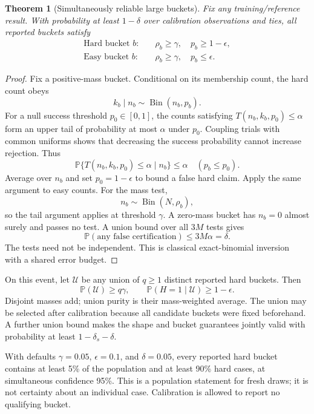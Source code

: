 \documentclass[10pt,letterpaper]{article}
\newtheorem{theorem}{Theorem}
\newcommand{\Prb}{\mathbb P}
\begin{document}
\begin{theorem}[Simultaneously reliable large buckets]\label{thm:buckets}
Fix any training/reference result. With probability at least $1-\delta$ over calibration observations and ties, all reported buckets satisfy
\[
 \boxed{\begin{aligned}
 \text{Hard bucket }b:&\quad\rho_b\ge\gamma,\quad p_b\ge1-\epsilon,\\
 \text{Easy bucket }b:&\quad\rho_b\ge\gamma,\quad p_b\le\epsilon.
 \end{aligned}}
\]
\end{theorem}
\begin{proof}
Fix a positive-mass bucket. Conditional on its membership count, the hard count obeys
\[
 k_b\mid n_b\sim\operatorname{Bin}(n_b,p_b).
\]
For a null success threshold $p_0\in[0,1]$, the counts satisfying $T(n_b,k_b,p_0)\le\alpha$ form an upper tail of probability at most $\alpha$ under $p_0$. Coupling trials with common uniforms shows that decreasing the success probability cannot increase rejection. Thus
\[
 \Prb\{T(n_b,k_b,p_0)\le\alpha\mid n_b\}\le\alpha\quad(p_b\le p_0).
\]
Average over $n_b$ and set $p_0=1-\epsilon$ to bound a false hard claim. Apply the same argument to easy counts. For the mass test,
\[
 n_b\sim\operatorname{Bin}(N,\rho_b),
\]
so the tail argument applies at threshold $\gamma$. A zero-mass bucket has $n_b=0$ almost surely and passes no test. A union bound over all $3M$ tests gives
\[
 \Prb(\text{any false certification})\le3M\alpha=\delta.
\]
The tests need not be independent. This is classical exact-binomial inversion~\cite{clopper} with a shared error budget.
\end{proof}

On this event, let $\mathcal U$ be any union of $q\ge1$ distinct reported hard buckets. Then
\[
 \Prb(\mathcal U)\ge q\gamma,\qquad
 \Prb(H=1\mid\mathcal U)\ge1-\epsilon.
\]
Disjoint masses add; union purity is their mass-weighted average. The union may be selected after calibration because all candidate buckets were fixed beforehand. A further union bound makes the shape and bucket guarantees jointly valid with probability at least $1-\delta_s-\delta$.

With defaults $\gamma=0.05$, $\epsilon=0.1$, and $\delta=0.05$, every reported hard bucket contains at least 5\% of the population and at least 90\% hard cases, at simultaneous confidence 95\%. This is a population statement for fresh draws; it is not certainty about an individual case. Calibration is allowed to report no qualifying bucket.
\end{document}

